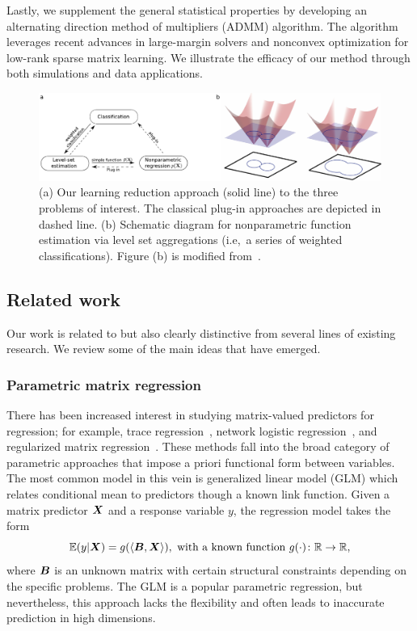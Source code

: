 \documentclass[11pt]{article}
\theoremstyle{plain}
\theoremstyle{definition}
\begin{document}
Lastly, we supplement the general statistical properties by developing an alternating direction method of multipliers (ADMM) algorithm. The algorithm leverages recent advances in large-margin solvers and nonconvex optimization for low-rank sparse matrix learning. We illustrate the efficacy of our method through both simulations and data applications. 

\begin{figure}
\centering
\includegraphics[width=1\textwidth]{level.pdf}
\caption{(a) Our learning reduction approach (solid line) to the three problems of interest. The classical plug-in approaches are depicted in dashed line.  (b) Schematic diagram for nonparametric function estimation via level set aggregations (i.e,\ a series of weighted classifications). Figure (b) is modified from~\cite{gibou2018review}. }\label{fig:diagram}
\end{figure}

\subsection{Related work}
Our work is related to but also clearly distinctive from several lines of existing research. We review some of the main ideas that have emerged. 
 
\subsubsection{Parametric matrix regression}
There has been increased interest in studying matrix-valued predictors for regression; for example, trace regression~\citep{fan2019generalized,hamidi2019low}, network logistic regression~\citep{relion2019network,guha2020bayesian}, and regularized matrix regression~\citep{zhou2014regularized,wang2017generalized}. These methods fall into the broad category of parametric approaches that impose a priori functional form between variables. The most common model in this vein is generalized linear model (GLM) which relates conditional mean to predictors though a known link function. Given a matrix predictor $\bm X$ and a response variable $y$, the regression model takes the form
\[
\mathbb{E}(y|\mX)=g(\langle \mB,\mX\rangle), \ \text{with a known function }g(\cdot)\colon \mathbb{R}\to \mathbb{R},
\]
where $\bm B$ is an unknown matrix with certain structural constraints depending on the specific problems. The GLM is a popular parametric regression, but nevertheless, this approach lacks the flexibility and often leads to inaccurate prediction in high dimensions. 
 
\end{document}

